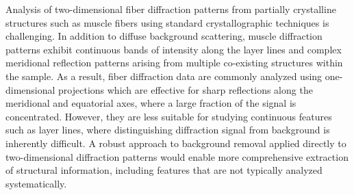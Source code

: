 \documentclass[iucr]{iucrjournals}
\begin{document}
Analysis of two-dimensional fiber diffraction patterns from partially crystalline structures such as muscle fibers using standard crystallographic techniques is challenging. In addition to diffuse background scattering, muscle diffraction patterns exhibit continuous bands of intensity along the layer lines and complex meridional reflection patterns arising from multiple co-existing structures within the sample. As a result, fiber diffraction data are commonly analyzed using one-dimensional projections which are effective for sharp reflections along the meridional and equatorial axes, where a large fraction of the signal is concentrated. However, they are less suitable for studying continuous features such as layer lines, where distinguishing diffraction signal from background is inherently difficult. A robust approach to background removal applied directly to two-dimensional diffraction patterns would enable more comprehensive extraction of structural information, including features that are not typically analyzed systematically.



\end{document}
